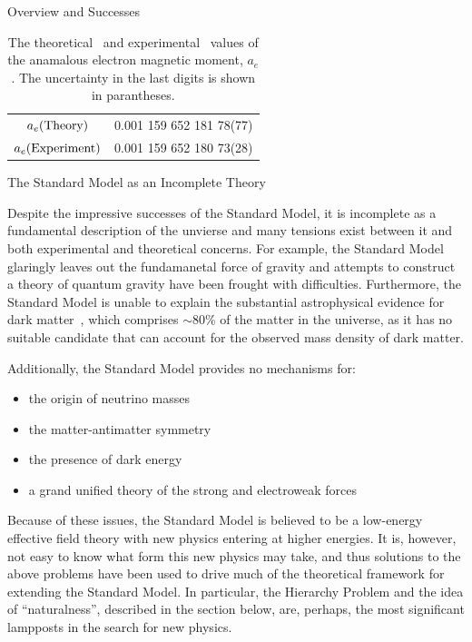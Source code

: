 \begin{section}{Overview and Successes}
\begin{table}[tbp!]
\centering
\begin{tabular}{ |c|c| }
\hline
$a_e \mathrm{(Theory)}$      &  0.001 159 652 181 78(77) \\
$a_e \mathrm{(Experiment)}$  &  0.001 159 652 180 73(28) \\
\hline
\end{tabular}
\caption{The theoretical~\cite{PhysRevLett.109.111807} and experimental~\cite{PhysRevLett.100.120801,PhysRevA.83.052122} values of the anamalous electron magnetic moment, $a_e$.
The uncertainty in the last digits is shown in parantheses.}
\label{tab:ae_values}
\end{table}

\end{section}

\begin{section}{The Standard Model as an Incomplete Theory}

Despite the impressive successes of the Standard Model, it is incomplete as a fundamental description of the unvierse and many tensions exist between it and both experimental and theoretical concerns.
For example, the Standard Model glaringly leaves out the fundamanetal force of gravity and attempts to construct a theory of quantum gravity have been frought with difficulties.
Furthermore, the Standard Model is unable to explain the substantial astrophysical evidence for dark matter~\cite{Bertone:2004pz,Rubin:1970zza}, which comprises $\sim 80\%$ of the matter in the universe, as it has no suitable candidate that can account for the observed mass density of dark matter.

Additionally, the Standard Model provides no mechanisms for:
\begin{itemize}
\item the origin of neutrino masses
\item the matter-antimatter symmetry
\item the presence of dark energy
\item a grand unified theory of the strong and electroweak forces
\end{itemize}

Because of these issues, the Standard Model is believed to be a low-energy effective field theory with new physics entering at higher energies.
It is, however, not easy to know what form this new physics may take, and thus solutions to the above problems have been used to drive much of the theoretical framework for extending the Standard Model.
In particular, the Hierarchy Problem and the idea of ``naturalness'', described in the section below, are, perhaps, the most significant lampposts in the search for new physics.


\end{section}
